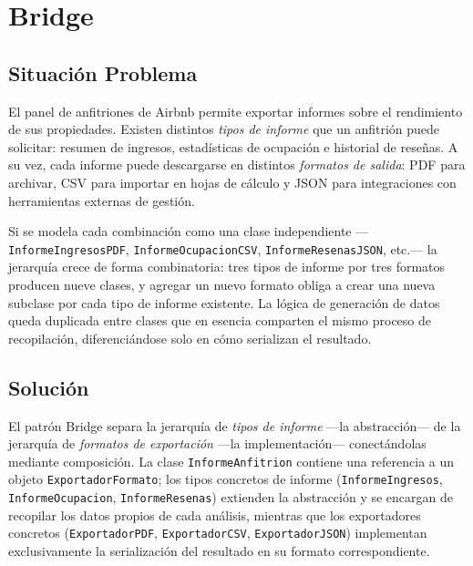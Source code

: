 
\chapter{Bridge}

\section{Situación Problema}

El panel de anfitriones de Airbnb permite exportar informes sobre el
rendimiento de sus propiedades. Existen distintos \emph{tipos de informe}
que un anfitrión puede solicitar: resumen de ingresos, estadísticas de
ocupación e historial de reseñas. A su vez, cada informe puede
descargarse en distintos \emph{formatos de salida}: PDF para archivar,
CSV para importar en hojas de cálculo y JSON para integraciones con
herramientas externas de gestión.

Si se modela cada combinación como una clase independiente
---\texttt{InformeIngresosPDF}, \texttt{InformeOcupacionCSV},
\texttt{InformeResenasJSON}, etc.--- la jerarquía crece de forma
combinatoria: tres tipos de informe por tres formatos producen nueve
clases, y agregar un nuevo formato obliga a crear una nueva subclase
por cada tipo de informe existente. La lógica de generación de datos
queda duplicada entre clases que en esencia comparten el mismo proceso
de recopilación, diferenciándose solo en cómo serializan el resultado.

\section{Solución}

El patrón Bridge separa la jerarquía de \emph{tipos de informe}
---la abstracción--- de la jerarquía de \emph{formatos de exportación}
---la implementación--- conectándolas mediante composición. La clase
\texttt{InformeAnfitrion} contiene una referencia a un objeto
\texttt{ExportadorFormato}; los tipos concretos de informe
(\texttt{InformeIngresos}, \texttt{InformeOcupacion},
\texttt{InformeResenas}) extienden la abstracción y se encargan de
recopilar los datos propios de cada análisis, mientras que los
exportadores concretos (\texttt{ExportadorPDF}, \texttt{ExportadorCSV},
\texttt{ExportadorJSON}) implementan exclusivamente la serialización
del resultado en su formato correspondiente.

